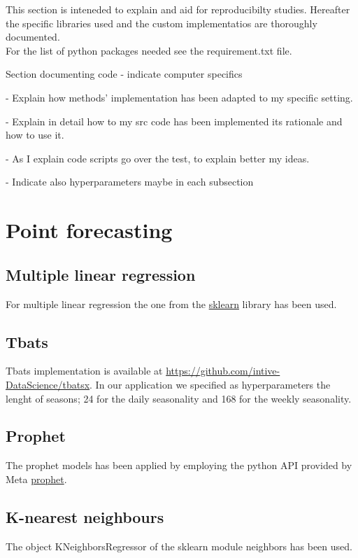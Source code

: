 This section is inteneded to explain and aid for reproducibilty studies. Hereafter the specific libraries used and the custom implementatios are thoroughly documented.
\\
For the list of python packages needed see the requirement.txt file.


Section documenting code
- indicate computer specifics


- Explain how methods' implementation has been
adapted to my specific setting.

- Explain in detail how to my src code has been implemented
its rationale and how to use it.

- As I explain code scripts go over the test, to 
explain better my ideas.

- Indicate also hyperparameters maybe in each subsection

\section{Point forecasting}
\subsection{Multiple linear regression}
For multiple linear regression the one from the \href{https://scikit-learn.org/stable/}{sklearn} library has been used.

\subsection{Tbats}
Tbats implementation is available at \url{https://github.com/intive-DataScience/tbatsx}.
In our application we specified as hyperparameters the lenght of seasons; 24 for the daily seasonality and 168 for the weekly seasonality.

\subsection{Prophet}
The prophet models has been applied by employing the python API provided by Meta \href{https://facebook.github.io/prophet/docs/quick_start.html}{prophet}.

\subsection{K-nearest neighbours}
The object KNeighborsRegressor of the sklearn module neighbors has been used.

